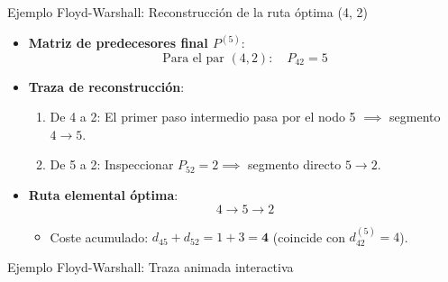 \documentclass[
  ignorenonframetext,
]{beamer}
\providecommand{\tightlist}{%
  \setlength{\itemsep}{0pt}\setlength{\parskip}{0pt}}
\begin{document}
\begin{frame}{Ejemplo Floyd-Warshall: Reconstrucción de la ruta óptima
(4, 2)}
\label{ejemplo-floyd-warshall-reconstrucciuxf3n-de-la-ruta-uxf3ptima-4-2}
\begin{itemize}
\item
  \textbf{Matriz de predecesores final \(P^{(5)}\)}:
  \[\text{Para el par }(4, 2): \quad P_{42} = 5\]
\item
  \textbf{Traza de reconstrucción}:

  \begin{enumerate}
  \tightlist
  \item
    De 4 a 2: El primer paso intermedio pasa por el nodo 5 \(\implies\)
    segmento \(4 \to 5\).
  \item
    De 5 a 2: Inspeccionar \(P_{52} = 2 \implies\) segmento directo
    \(5 \to 2\).
  \end{enumerate}
\item
  \textbf{Ruta elemental óptima}: \[4 \to 5 \to 2\]

  \begin{itemize}
  \tightlist
  \item
    Coste acumulado: \(d_{45} + d_{52} = 1 + 3 = \mathbf{4}\) (coincide
    con \(d_{42}^{(5)} = 4\)).
  \end{itemize}
\end{itemize}
\end{frame}

\begin{frame}{Ejemplo Floyd-Warshall: Traza animada interactiva}
\label{ejemplo-floyd-warshall-traza-animada-interactiva}
\end{frame}
\end{document}
